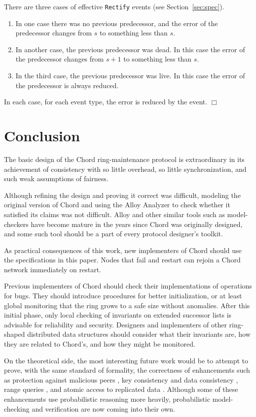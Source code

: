 \documentclass[conference]{IEEEtran}
\begin{document}
There are three cases of effective
\small
{\tt Rectify}
\normalsize
events (see Section~\ref{sec:spec}).
\begin{enumerate}
\item
In one case there was no previous predecessor, and the error of
the predecessor changes from $s$ to something less than $s$.
\item
In another case,
the previous predecessor was dead.
In this case the error of
the predecessor changes from $s + 1$ to something less than $s$.
\item
In the third case,
the previous predecessor was live.
In this case the error of
the predecessor is always reduced.
\end{enumerate}
In each case, for each event type, the error is reduced by the event.
$\Box$

\section{Conclusion}

The basic design of the Chord ring-maintenance protocol is 
extraordinary in its achievement of consistency with so little
overhead, so little synchronization, and such weak assumptions of
fairness.

Although refining the design and proving it correct
was difficult, modeling the original version of Chord and using
the Alloy Analyzer to check whether it satisfied its claims was not
difficult.
Alloy and other similar tools such as model-checkers have become
mature in the years since Chord was originally designed, and some
such tool should be a part of every protocol designer's toolkit.

As practical consequences of this work, new implementers of
Chord should use the specifications in this
paper.
Nodes that fail and restart can rejoin a Chord network immediately
on restart.

Previous implementers of Chord should
check their implementations of operations
for bugs.
They should introduce procedures for better initialization,
or at least global monitoring that the ring grows to a safe size without
anomalies.
After this initial phase, only local checking of invariants on
extended successor lists is advisable for reliability and security.
Designers and implementers of other ring-shaped distributed
data structures should consider what their invariants are,
how they are related to Chord's, and how they might be monitored.

On the theoretical side,
the most interesting future work would be to attempt to prove,
with the same standard of formality, the
correctness of enhancements such as
protection against malicious peers
\cite{awerbuch-robust,chord-byz,sechord},
key consistency and data consistency \cite{scatter},
range queries \cite{rangequeries},
and atomic access to replicated data \cite{atomicchord,etna}.
Although some of these enhancements use probabilistic reasoning
more heavily, 
probabilistic model-checking and verification are now coming into
their own.
\end{document}
